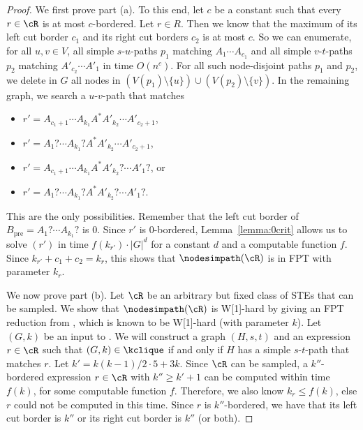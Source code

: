 \documentclass[a4paper,english]{lipics-v2016}
\theoremstyle{plain}
\begin{document}
\begin{proof}

  We first prove part (a). To this end, let $c$ be a constant such
  that every $r \in \cR$ is at most $c$-bordered. Let $r \in R$. 
  Then we know that the
  maximum of its left cut border $c_1$ and its right cut borders $c_2$ is at most $c$.
    So we can enumerate, for all $u,v \in V$, all simple $s$-$u$-paths $p_1$ matching
  $A_1 \cdots A_{c_1}$ and all simple $v$-$t$-paths $p_2$ matching
  $A'_{c_2} \cdots A'_1$ in time $O(n^c)$. For all such
  node-disjoint paths $p_1$ and $p_2$, we delete in $G$ all nodes in
  $(V(p_1)\setminus\{u\}) \cup (V(p_2) \setminus \{v\})$. 
  In the
  remaining graph, we search a $u$-$v$-path that matches
  \begin{itemize}
  \item $r'=A_{c_1+1} \cdots A_{k_1} A^* A'_{k_2} \cdots A'_{c_2+1}$,
  \item $r'=A_{1}? \cdots A_{k_1}? A^* A'_{k_2} \cdots A'_{c_2+1}$,
  \item $r'=A_{c_1+1} \cdots A_{k_1} A^* A'_{k_2}? \cdots A'_{1}?$, or
  \item $r'=A_{1}? \cdots A_{k_1}? A^* A'_{k_2}? \cdots A'_{1}?$.
  \end{itemize}
  This are the only possibilities. Remember that the left cut border of $B_\text{pre}=A_{1}? \cdots A_{k_1}?$ is 0.
  Since $r'$ is 0-bordered,
  Lemma~\ref{lemma:0crit} allows us to solve \nodesimpath$(r')$ in time $f(k_{r'})\cdot |G|^d$ for a constant
  $d$ and a computable function $f$. Since $k_{r'}+c_1+c_2 = k_r$, this
  shows that $\nodesimpath(\cR)$ is in FPT with parameter $k_r$. 

  We now prove part (b). Let $\cR$ be an arbitrary but fixed class of
  STEs that can be sampled.
    We show that $\nodesimpath(\cR)$ is W[1]-hard by giving an FPT reduction from
  \kclique, which is known to be W[1]-hard (with parameter $k$). 
  Let $(G,k)$ be an input to \kclique. We will construct a graph
  $(H,s,t)$ and an expression $r \in \cR$ such that $(G,k) \in
  \kclique$ if and only if $H$ has a simple $s$-$t$-path that matches
  $r$. Let $k' = k(k-1)/2\cdot 5 + 3k$.  Since $\cR$ can be sampled, a
  $k''$-bordered expression $r\in\cR$ with $k'' \geq k'+1$ can be
  computed within time $f(k)$, for some computable function
  $f$. Therefore, we also know $k_r \leq f(k)$, else $r$ could not be computed in this time.     
  Since $r$ is $k''$-bordered, we have that its left cut border is $k''$ or its right cut border is $k''$ (or both). 
  

\end{proof}
\end{document}
